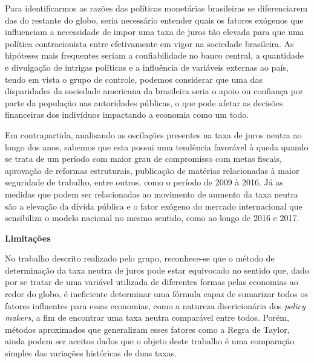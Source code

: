  Para identificarmos as raz\~{o}es das pol\'{i}ticas monet\'{a}rias brasileiras se diferenciarem das do restante do globo, seria necess\'{a}rio entender quais os fatores ex\'{o}genos que influenciam a necessidade de impor uma taxa de juros t\~{a}o elevada para que uma pol\'{i}tica contracionista entre efetivamente em vigor na sociedade brasileira. As hip\'{o}teses mais frequentes seriam a confiabilidade no banco central, a quantidade e divulga\c{c}\~{a}o de intrigas pol\'{i}ticas e a influ\^{e}ncia de vari\'{a}veis externas ao pa\'{i}s, tendo em vista o grupo de controle, podemos considerar que uma das disparidades da sociedade americana da brasileira seria o apoio ou confian\c{c}a por parte da popula\c{c}\~{a}o nas autoridades p\'{u}blicas, o que pode afetar as decis\~{o}es financeiras dos indiv\'{i}duos impactando a economia como um todo. 

 Em contrapartida, analisando as oscila\c{c}\~{o}es presentes na taxa de juros neutra ao longo dos anos, sabemos que esta possui uma tend\^{e}ncia favor\'{a}vel \`{a} queda quando se trata de um per\'{i}odo com maior grau de compromisso com metas fiscais, aprova\c{c}\~{a}o de reformas estruturais, publica\c{c}\~{a}o de mat\'{e}rias relacionadas \`{a} maior seguridade de trabalho, entre outros, como o per\'{i}odo de 2009 \`{a} 2016. J\'{a} as medidas que podem ser relacionadas ao movimento de aumento da taxa neutra s\~{a}o a eleva\c{c}\~{a}o da d\'{i}vida p\'{u}blica e o fator ex\'{o}geno do mercado internacional que sensibiliza o modelo nacional no mesmo sentido, como ao longo de 2016 e 2017.  

\noindent 

\noindent \textbf{Limita\c{c}\~{o}es }

\noindent 

 No trabalho descrito realizado pelo grupo, reconhece-se que o m\'{e}todo de determina\c{c}\~{a}o da taxa neutra de juros pode estar equivocado no sentido que, dado por se tratar de uma vari\'{a}vel utilizada de diferentes formas pelas economias ao redor do globo, \'{e} ineficiente determinar uma f\'{o}rmula capaz de sumarizar todos os fatores influentes para essas economias, como a natureza discricion\'{a}ria dos \textit{policy makers}, a fim de encontrar uma taxa neutra compar\'{a}vel entre todos. Por\'{e}m, m\'{e}todos aproximados que generalizam esses fatores como a Regra de Taylor, ainda podem ser aceitos dados que o objeto deste trabalho \'{e} uma compara\c{c}\~{a}o simples das varia\c{c}\~{o}es hist\'{o}ricas de duas taxas. 

